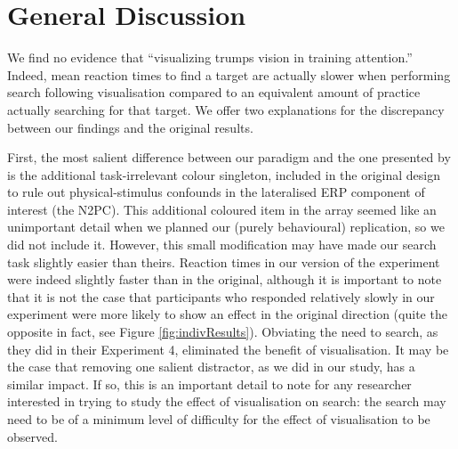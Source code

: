 \documentclass[smallextended]{svjour3}       %
\begin{document}



\section{General Discussion}
\label{sec:discussion}

We find no evidence that ``visualizing trumps vision in training attention.'' Indeed, mean reaction times to find a target are actually slower when performing search following visualisation compared to an equivalent amount of practice actually searching for that target. We offer two explanations for the discrepancy between our findings and the original results.

First, the most salient difference between our paradigm and the one presented by \cite{reinhart2015} is the additional task-irrelevant colour singleton, included in the original design to rule out physical-stimulus confounds in the lateralised ERP component of interest (the N2PC). This additional coloured item in the array seemed like an unimportant detail when we planned our (purely behavioural) replication, so we did not include it. However, this small modification may have made our search task slightly easier than theirs. Reaction times in our version of the experiment were indeed slightly faster than in the original, although it is important to note that it is not the case that participants who responded relatively slowly in our experiment were more likely to show an effect in the original direction (quite the opposite in fact, see Figure \ref{fig:indivResults}). Obviating the need to search, as they did in their Experiment 4, eliminated the benefit of visualisation. It may be the case that removing one salient distractor, as we did in our study, has a similar impact. If so, this is an important detail to note for any researcher interested in trying to study the effect of visualisation on search: the search may need to be of a minimum level of difficulty for the effect of visualisation to be observed. 
 
\end{document}
